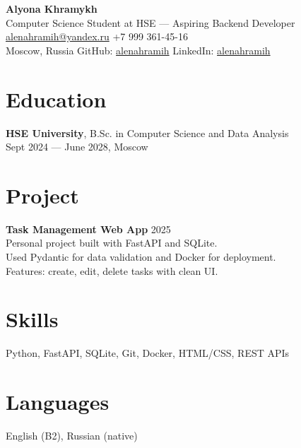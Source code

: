 \documentclass[10pt,a4paper]{article}
\begin{document}
\begin{center}
    {\LARGE\bfseries Alyona Khramykh} \\
    Computer Science Student at HSE — Aspiring Backend Developer \\
    \href{mailto:alenahramih@yandex.ru}{alenahramih@yandex.ru} \quad +7 999 361-45-16 \\
    Moscow, Russia \quad GitHub: \href{https://github.com/khramykhalena}{alenahramih} \quad LinkedIn: \href{https://linkedin.com/in/alenahramih}{alenahramih}
\end{center}

\vspace{1em}

\section*{Education}
\textbf{HSE University}, B.Sc. in Computer Science and Data Analysis \\
Sept 2024 — June 2028, Moscow

\section*{Project}
\textbf{Task Management Web App} \hfill 2025 \\
Personal project built with FastAPI and SQLite. \\
Used Pydantic for data validation and Docker for deployment. \\
Features: create, edit, delete tasks with clean UI.

\section*{Skills}
Python, FastAPI, SQLite, Git, Docker, HTML/CSS, REST APIs

\section*{Languages}
English (B2), Russian (native)
\end{document}
